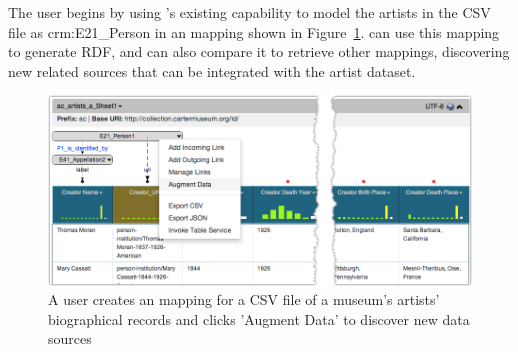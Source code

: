 The user begins by using \karma's existing capability to model the artists in the CSV file as crm:E21\_Person in an \rtworml mapping shown in Figure~\ref{fig:simple-model-screenshot}.  
\karma can use this mapping to generate RDF,  
and can also compare it to retrieve other mappings, discovering new related sources that can be integrated with the artist dataset.
\begin{figure}[b]
\centering
\includegraphics[width=4.8in]{images/4-simple-model.png}
\vspace{-20pt}
\caption{A \karma user creates an \rtworml mapping for a CSV file of a museum's artists' biographical records and clicks 'Augment Data' to discover new data sources}
\vspace{-21pt}
\label{fig:simple-model-screenshot}
\end{figure}